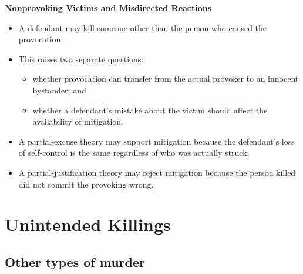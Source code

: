\documentclass[11pt]{tex/lawoutline}
\begin{document}
\textbf{Nonprovoking Victims and Misdirected Reactions}

\begin{itemize}
    \item A defendant may kill someone other than the person who caused the provocation.
    \item This raises two separate questions:
    \begin{itemize}
        \item whether provocation can transfer from the actual provoker to an innocent bystander; and
        \item whether a defendant's mistake about the victim should affect the availability of mitigation.
    \end{itemize}
    \item A partial-excuse theory may support mitigation because the defendant's loss of self-control is the same regardless of who was actually struck.
    \item A partial-justification theory may reject mitigation because the person killed did not commit the provoking wrong.
\end{itemize}

\chapter{Unintended Killings}


\section{Other types of murder}
\end{document}
